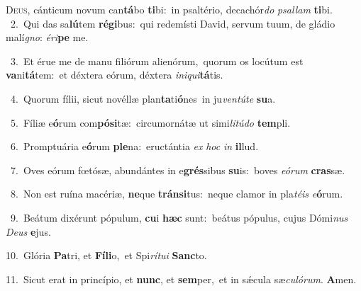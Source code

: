 \lettrine{\initial\textcolor{\initialcolor}{D}}{eus,} cánticum novum can\-\textbf{tá}\-bo \textbf{ti}\-bi:~\star in psaltério, decachór\textit{do} \textit{psal}\-\textit{lam} \textbf{ti}\-bi.\\
{\numbfont\textcolor{\numbcolor}{~2.}}~Qui das sa\-\textbf{lú}\-tem \textbf{ré}\-\textbf{gi}bus:~\star qui redemísti David, servum tuum, de gládio malí\-\textit{gno}\-: \textit{é}\-\textit{ri}\textbf{pe} me.\par
{\numbfont\textcolor{\numbcolor}{~3.}}~Et érue me de manu filiórum alienórum,~\dagger quorum os locútum est \textbf{va}\-ni\-\textbf{tá}\-tem:~\star et déxtera eórum, déxtera \textit{in}\-\textit{i}\textit{qui}\textbf{tá}tis.\par
{\numbfont\textcolor{\numbcolor}{~4.}}~Quorum fílii, sicut novéllæ plan\-\textbf{ta}\-ti\-\textbf{ó}\-nes~\star in ju\-\textit{ven}\-\textit{tú}\textit{te} \textbf{su}\-a.\par
{\numbfont\textcolor{\numbcolor}{~5.}}~Fíliæ e\-\textbf{ó}\-rum com\-\textbf{pó}\-\textbf{si}tæ:~\star circumornátæ ut simi\-\textit{li}\-\textit{tú}\textit{do} \textbf{tem}\-pli.\par
{\numbfont\textcolor{\numbcolor}{~6.}}~Promptuária e\-\textbf{ó}\-rum \textbf{ple}\-na:~\star eructántia \textit{ex} \textit{hoc} \textit{in} \textbf{il}\-lud.\par
{\numbfont\textcolor{\numbcolor}{~7.}}~Oves eórum fœtósæ, abundántes in e\-\textbf{grés}\-sibus \textbf{su}\-is:~\star boves \textit{e}\-\textit{ó}\textit{rum} \textbf{cras}\-sæ.\par
{\numbfont\textcolor{\numbcolor}{~8.}}~Non est ruína macériæ, \textbf{ne}\-que \textbf{tráns}\-\textbf{i}tus:~\star neque clamor in pla\-\textit{té}\-\textit{is} \textit{e}\-\textbf{ó}rum.\par
{\numbfont\textcolor{\numbcolor}{~9.}}~Beátum dixérunt pópulum, \textbf{cu}\-i \textbf{hæc} sunt:~\star beátus pópulus, cujus Dómi\textit{nus} \textit{De}\-\textit{us} \textbf{e}\-jus.\par
{\numbfont\textcolor{\numbcolor}{10.}}~Glória \textbf{Pa}\-tri, et \textbf{Fí}\-\textbf{li}o,~\star et Spi\-\textit{rí}\-\textit{tu}\textit{i} \textbf{Sanc}\-to.\par
{\numbfont\textcolor{\numbcolor}{11.}}~Sicut erat in princípio, et \textbf{nunc}\-, et \textbf{sem}\-per,~\star et in sǽcula sæ\-\textit{cu}\-\textit{ló}\textit{rum}. \textbf{A}\-men.\par
